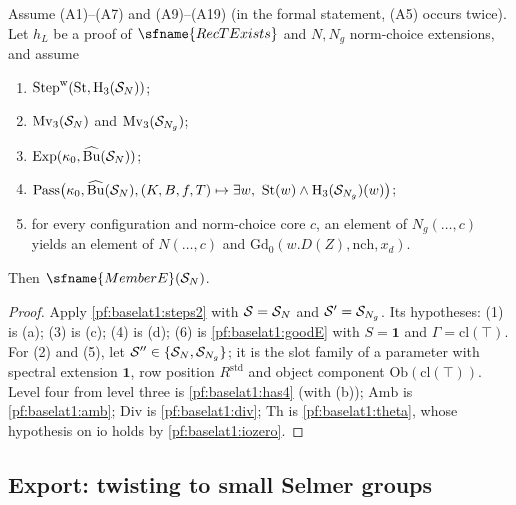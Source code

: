 \begin{theorem}[Closing]\label{pf:baselat1:closing}
Assume (A1)--(A7) and (A9)--(A19) (in the formal statement, (A5) occurs twice). Let $h_L$ be a proof of
$\sfname{RecTExists}$ and $N,N_g$ norm-choice extensions, and assume
\begin{enumerate}[label=(\alph*)]
\item $\mathrm{Step}^{\mathrm w}(\mathrm{St},\mathrm{H}_3(\mathcal S_N))$;
\item $\mathrm{Mv}_3(\mathcal S_N)$ and $\mathrm{Mv}_3(\mathcal S_{N_g})$;
\item $\mathrm{Exp}(\kappa_0,\widehat{\mathrm{Bu}}(\mathcal S_N))$;
\item $\mathrm{Pass}\bigl(\kappa_0,\widehat{\mathrm{Bu}}(\mathcal S_N),(K,B,f,T)\mapsto\exists w,\
  \mathrm{St}(w)\wedge\mathrm{H}_3(\mathcal S_{N_g})(w)\bigr)$;
\item for every configuration and norm-choice core $c$, an element of $N_g(\dots,c)$ yields an element of
  $N(\dots,c)$ and $\mathrm{Gd}_0(w.D(Z),\mathrm{nch},x_d)$.
\end{enumerate}
Then $\sfname{MemberE}(\baselatoneS_N)$.
\end{theorem}

\begin{proof}
Apply \cref{pf:baselat1:steps2} with $\mathcal S=\mathcal S_N$ and $\mathcal S'=\mathcal S_{N_g}$. Its
hypotheses: (1) is (a); (3) is (c); (4) is (d); (6) is \cref{pf:baselat1:goodE} with
$S=\mathbf{1}$ and $\Gamma=\mathrm{cl}(\top)$. For (2) and (5), let
$\mathcal S''\in\{\mathcal S_N,\mathcal S_{N_g}\}$; it is the slot family of a parameter with spectral
extension $\mathbf{1}$, row position $R^{\mathrm{std}}$ and object component
$\mathrm{Ob}(\mathrm{cl}(\top))$. Level four from level three is \cref{pf:baselat1:has4}
(with (b)); $\mathrm{Amb}$ is \cref{pf:baselat1:amb}; $\mathrm{Div}$ is \cref{pf:baselat1:div};
$\mathrm{Th}$ is \cref{pf:baselat1:theta}, whose hypothesis on $\mathrm{io}$ holds by \cref{pf:baselat1:iozero}.
\end{proof}

\subsection{Export: twisting to small Selmer groups}\label{pf:baselat1:ssec:export}

